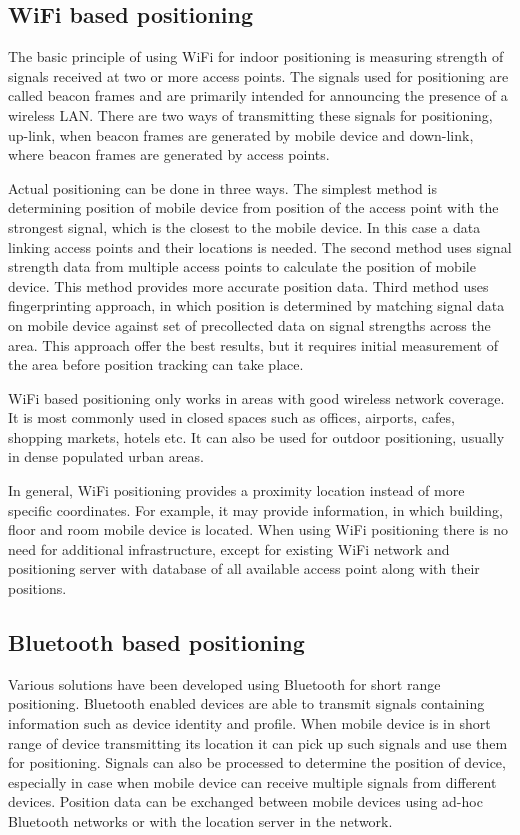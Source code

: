 \subsection{WiFi based positioning}
The basic principle of using WiFi for indoor positioning is measuring strength of signals received at two or more access points. The signals used for positioning are called beacon frames and are primarily intended for announcing the presence of a wireless LAN. There are two ways of transmitting these signals for positioning, up-link, when beacon frames are generated by mobile device and down-link, where beacon frames are generated by access points.

Actual positioning can be done in three ways. The simplest method is determining position of mobile device from position of the access point with the strongest signal, which is the closest to the mobile device. In this case a data linking access points and their locations is needed. The second method uses signal strength data from multiple access points to calculate the position of mobile device. This method provides more accurate position data. Third method uses fingerprinting approach, in which position is determined by matching signal data on mobile device against set of precollected data on signal strengths across the area. This approach offer the best results, but it requires initial measurement of the area before position tracking can take place.

WiFi based positioning only works in areas with good wireless network coverage. It is most commonly used in closed spaces such as offices, airports, cafes, shopping markets, hotels etc. It can also be used for outdoor positioning, usually in dense populated urban areas.

In general, WiFi positioning provides a proximity location instead of more specific coordinates. For example, it may provide information, in which building, floor and room mobile device is located. When using WiFi positioning there is no need for additional infrastructure, except for existing WiFi network and positioning server with database of all available access point along with their positions.

\subsection{Bluetooth based positioning}
Various solutions have been developed using Bluetooth for short range positioning. Bluetooth enabled devices are able to transmit signals containing information such as device identity and profile. When mobile device is in short range of device transmitting its location it can pick up such signals and use them for positioning. Signals can also be processed to determine the position of device, especially in case when mobile device can receive multiple signals from different devices. Position data can be exchanged between mobile devices using ad-hoc Bluetooth networks or with the location server in the network.

